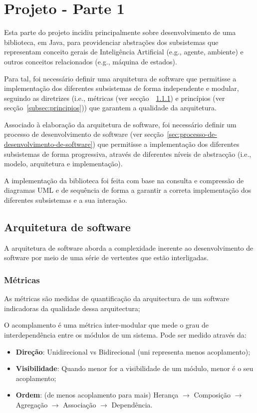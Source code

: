 \chapter{Projeto - Parte 1} \label{ch:projeto-parte1}

Esta parte do projeto incidiu principalmente sobre desenvolvimento de uma biblioteca, em Java, para providenciar abstrações dos subsistemas que representam conceito gerais de Inteligência Artificial (e.g., agente, ambiente) e outros conceitos relacionados (e.g., máquina de estados).

Para tal, foi necessário definir uma arquitetura de software que permitisse a implementação dos diferentes subsistemas de forma independente e modular, seguindo as diretrizes (i.e., métricas (ver secção~~\ref{subsec:metricas}) e princípios (ver secção~\ref{subsec:principios})) que garantem a qualidade da arquitetura.

Associado à elaboração da arquitetura de software, foi necessário definir um processo de desenvolvimento de software (ver secção~\ref{sec:processo-de-desenvolvimento-de-software}) que permitisse a implementação dos diferentes subsistemas de forma progressiva, através de diferentes níveis de abstracção (i.e., modelo, arquitetura e implementação).

A implementação da biblioteca foi feita com base na consulta e compressão de diagramas UML e de sequência de forma a garantir a correta implementação dos diferentes subsistemas e a sua interação.


\section{Arquitetura de software}\label{sec:arquitetura-de-software}

A arquitetura de software aborda a complexidade inerente ao desenvolvimento de software por meio de uma série de vertentes que estão interligadas.

\subsection{Métricas}\label{subsec:metricas}

As métricas são medidas de quantificação da arquitectura de um software indicadoras da qualidade dessa arquitectura;

O acomplamento é uma métrica inter-modular que mede o grau de interdependência entre os módulos de um sistema. Pode ser medido através da:
\begin{itemize}
    \item \textbf{Direção}: Unidirecional vs Bidirecional (uni representa menos acoplamento);
    \item \textbf{Visibilidade}: Quando menor for a visibilidade de um módulo, menor é o seu acoplamento;
    \item \textbf{Ordem}: (de menos acoplamento para mais) Herança $\rightarrow$ Composição $\rightarrow$ Agregação $\rightarrow$ Associação $\rightarrow$ Dependência.
\end{itemize}

